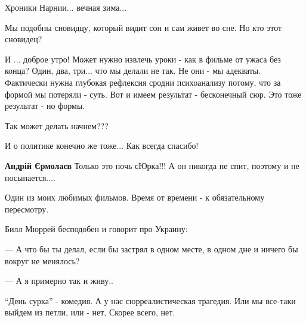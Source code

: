 \begin{itemize}
Хроники Нарнии... вечная зима...

Мы подобны сновидцу, который видит сон и сам живет во сне. Но кто этот сновидец?


И ... доброе утро! Может нужно извлечь уроки - как в фильме от ужаса без конца?
Один, два, три... что мы делали не так. Не они - мы адекваты. Фактически нужна
глубокая рефлексия сродни психоанализу потому, что за формой мы потеряли -
суть. Вот и имеем результат - бесконечный сюр. Это тоже результат - но формы.

Так может делать начнем???

И о политике конечно же тоже... Как всегда спасибо!


\textbf{Андрій Єрмолаєв}
Только это ночь сЮрка!!!
А он никогда не спит, поэтому и не посыпается....


Один из моих любимых фильмов. Время от времени - к обязательному пересмотру.

Билл Мюррей бесподобен и говорит про Украину:

— А что бы ты делал, если бы застрял в одном месте, в одном дне и ничего бы
вокруг не менялось?

— А я примерно так и живу..



\enquote{День сурка} - комедия. А у нас сюрреалистическая трагедия. Или мы
все-таки выйдем из петли, или - нет, Скорее всего, нет.


\end{itemize} %
